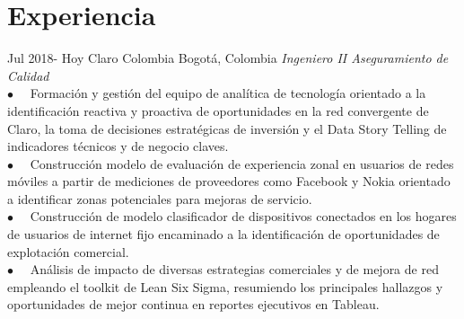 \documentclass[11pt]{friggeri-cv} %
\begin{document}
\section{Experiencia}
\begin{entrylist}
\entry
{Jul 2018- \newline
Hoy}
{Claro Colombia}
{Bogotá, Colombia}
{\emph{Ingeniero II Aseguramiento de Calidad} \\
$\bullet\quad$ Formación y gestión del equipo de analítica de tecnología orientado a la identificación reactiva y proactiva de oportunidades en la red convergente de Claro, la toma de decisiones estratégicas de inversión y el Data Story Telling de indicadores técnicos y de negocio claves.\\
$\bullet\quad$ Construcción modelo de evaluación de experiencia zonal en usuarios de redes móviles a partir de mediciones de proveedores como Facebook y Nokia orientado a identificar zonas potenciales para mejoras de servicio.\\
$\bullet\quad$ Construcción de modelo clasificador de dispositivos conectados en los hogares de usuarios de internet fijo encaminado a la identificación de oportunidades de explotación comercial.\\
$\bullet\quad$ Análisis de impacto de diversas estrategias comerciales y de mejora de red empleando el toolkit de Lean Six Sigma, resumiendo los principales hallazgos y oportunidades de mejor continua en reportes ejecutivos en Tableau.\\
}
\end{entrylist} 
\end{document}
